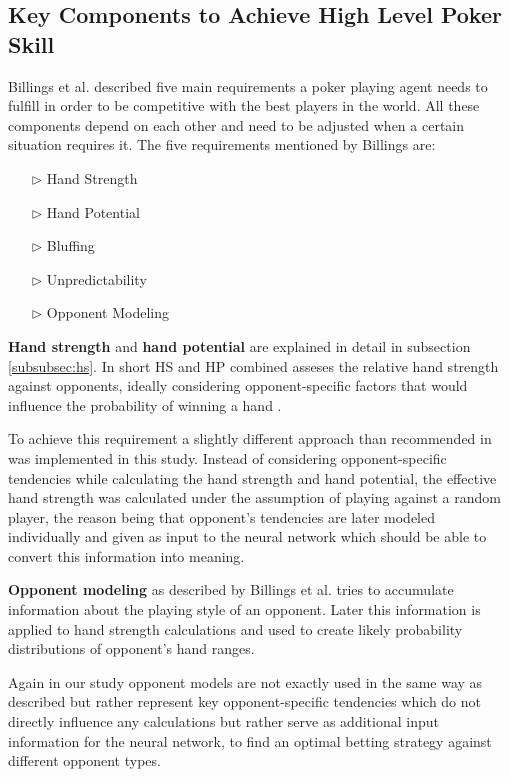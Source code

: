 \subsection{Key Components to Achieve High Level Poker Skill}
Billings et al. \cite{challenge_of_poker} described five main requirements a poker playing agent needs to fulfill in order to be competitive with the best players in the world. All these components depend on each other and need to be adjusted when a certain situation requires it. The five requirements mentioned by Billings are:
\begin{itemize}
\item[$\triangleright$] Hand Strength
\item[$\triangleright$] Hand Potential
\item[$\triangleright$] Bluffing
\item[$\triangleright$] Unpredictability
\item[$\triangleright$] Opponent Modeling
\end{itemize}
\textbf{Hand strength} and \textbf{hand potential} are explained in detail in subsection \ref{subsubsec:hs}. In short HS and HP combined asseses the relative hand strength against opponents, ideally considering opponent-specific factors that would influence the probability of winning a hand \cite{challenge_of_poker}. \par
To achieve this requirement a slightly different approach than recommended in \cite[p. 208]{challenge_of_poker} was implemented in this study. Instead of considering opponent-specific tendencies while calculating the hand strength and hand potential, the effective hand strength was calculated under the assumption of playing against a random player, the reason being that opponent's tendencies are later modeled individually and given as input to the neural network which should be able to convert this information into meaning.\par
\textbf{Opponent modeling} as described by Billings et al. \cite[p. 208]{challenge_of_poker} tries to accumulate information about the playing style of an opponent. Later this information is applied to hand strength calculations and used to create likely probability distributions of opponent's hand ranges. \par
Again in our study opponent models are not exactly used in the same way as described but rather represent key opponent-specific tendencies which do not directly influence any calculations but rather serve as additional input information for the neural network, to find an optimal betting strategy against different opponent types. \par
